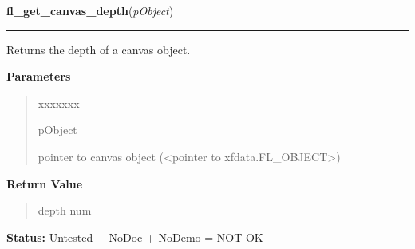 \hspace{.8\funcindent}\begin{boxedminipage}{\funcwidth}

    \raggedright \textbf{fl\_get\_canvas\_depth}(\textit{pObject})

    \vspace{-1.5ex}

    \rule{\textwidth}{0.5\fboxrule}
\setlength{\parskip}{2ex}
    Returns the depth of a canvas object.

\setlength{\parskip}{1ex}
      \textbf{Parameters}
      \vspace{-1ex}

      \begin{quote}
        \begin{Ventry}{xxxxxxx}

          \item[pObject]

          pointer to canvas object ({\textless}pointer to 
          xfdata.FL\_OBJECT{\textgreater})

        \end{Ventry}

      \end{quote}

      \textbf{Return Value}
    \vspace{-1ex}

      \begin{quote}
      depth num

      \end{quote}

\textbf{Status:} Untested + NoDoc + NoDemo = NOT OK



    \end{boxedminipage}

    \label{xformslib:library:fl_remove_canvas_handler}

    \vspace{0.5ex}

